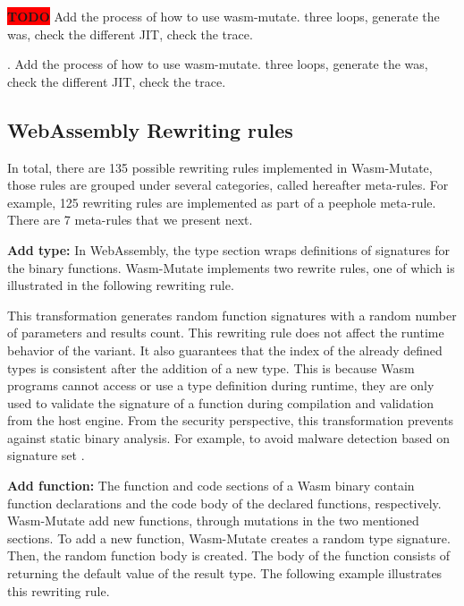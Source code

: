 \documentclass[sigplan,screen]{acmart}
\newcommand*\badge[1]{ \colorbox{red}{\color{white}#1}}
\newcommand{\tool}{{\sc Wasm-Mutate}\xspace}
\newcommand{\todo}[1]{%
\refstepcounter{todo}
\noindent\textbf{\badge{TODO}} {\color{red}#1}
\addcontentsline{td}{todo}
{\color{red}\thesection.\thetodo\xspace #1}}
\begin{document}
\todo{Add the process of how to use wasm-mutate. three loops, generate the was, check  the different JIT, check the trace.}


\subsection{WebAssembly Rewriting rules}

% 

In total, there are 135 possible rewriting rules implemented in \tool, those rules are grouped under several categories, called hereafter meta-rules.
For example, 125 rewriting rules are implemented as part of a peephole meta-rule.
There are 7 meta-rules that we present next.

\textbf{Add type:}
In WebAssembly, the type section wraps definitions of signatures for the binary functions.
\tool implements two rewrite rules, one of which is illustrated in the following rewriting rule. 



This transformation generates random function signatures with a random number of parameters and results count.
This rewriting rule does not affect the runtime behavior of the  variant.
It also guarantees that the index of the already defined types is consistent after the addition of a new type. This is because Wasm programs cannot access or use a type definition during runtime, they are only used to validate the signature of a function during compilation and validation from the host engine.
From the security perspective, this transformation prevents against static binary analysis. 
For example, to avoid malware detection based on signature set \cite{CABRERAARTEAGA2023103296}.

\textbf{Add function:} The function and code sections of a Wasm binary contain function  declarations and the code body of the declared functions, respectively.
\tool add new functions, through mutations in the two mentioned sections.
To add a new function, \tool creates a random type signature.
Then, the random function body is created.
The body of the function consists of returning the default value of the result type.
The following example illustrates this rewriting rule.
\end{document}
